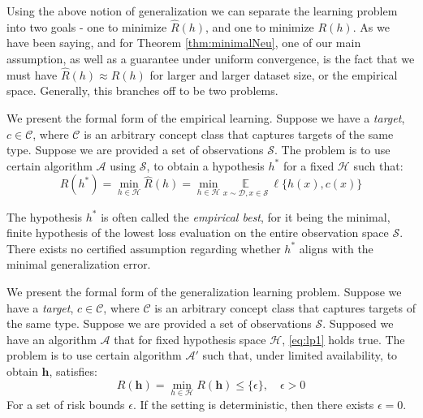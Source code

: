 Using the above notion of generalization we can separate the learning problem into two goals - one to minimize $\hat{R}(h)$, and one to minimize $R(h)$. As we have been saying, and for Theorem \ref{thm:minimalNeu}, one of our main assumption, as well as a guarantee under uniform convergence, is the fact that we must have $\hat{R}(h)\approx R(h)$ for larger and larger dataset size, or the empirical space. Generally, this branches off to be two problems. 
\begin{definition}
    We present the formal form of the empirical learning. Suppose we have a \textit{target}, $c\in\mathcal{C}$, where $\mathcal{C}$ is an arbitrary concept class that captures targets of the same type. Suppose we are provided a set of observations $\mathcal{S}$. The problem is to use certain algorithm $\mathcal{A}$ using $\mathcal{S}$, to obtain a hypothesis $h^{*}$ for a fixed $\mathcal{H}$ such that: 
    \begin{equation}\label{eq:lp1}
        R(h^{*}) = \min_{h\in\mathcal{H}} \hat{R}(h) = \min_{h\in\mathcal{H}} \underset{x\sim\mathcal{D}, x\in \mathcal{S}}{\mathbb{E}}\:\ell\{h(x),c(x)\}
    \end{equation} 
\end{definition}

The hypothesis $h^{*}$ is often called the \textit{empirical best}, for it being the minimal, finite hypothesis of the lowest loss evaluation on the entire observation space $\mathcal{S}$. There exists no certified assumption regarding whether $h^{*}$ aligns with the minimal generalization error.
\begin{definition}
    We present the formal form of the generalization learning problem. Suppose we have a \textit{target}, $c\in\mathcal{C}$, where $\mathcal{C}$ is an arbitrary concept class that captures targets of the same type. Suppose we are provided a set of observations $\mathcal{S}$. Supposed we have an algorithm $\mathcal{A}$ that for fixed hypothesis space $\mathcal{H}$, \ref{eq:lp1} holds true. The problem is to use certain algorithm $\mathcal{A}'$ such that, under limited availability, to obtain $\bm{h}$, satisfies: \begin{equation}
        R(\bm{h}) = \min_{h\in \mathcal{H}} R(\bm{h}) \leq \{\epsilon\}, \quad \epsilon > 0 
    \end{equation}
    For a set of risk bounds $\epsilon$. If the setting is deterministic, then there exists $\epsilon=0$. 
\end{definition}

